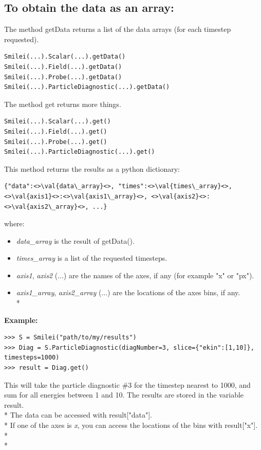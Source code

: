 \documentclass[11pt]{article}
\newcommand{\code}[1]{\colorbox{yellow!15}{\ttfamily #1}}
\newcommand{\val}[1]{{\ttfamily \textit{#1}}}
\begin{document}
\subsection{To obtain the data as an array:}
The method \code{getData} returns a list of the data arrays (for each timestep requested).
\begin{lstlisting}
Smilei(...).Scalar(...).getData()
Smilei(...).Field(...).getData()
Smilei(...).Probe(...).getData()
Smilei(...).ParticleDiagnostic(...).getData()
\end{lstlisting}

The method \code{get} returns more things.
\begin{lstlisting}
Smilei(...).Scalar(...).get()
Smilei(...).Field(...).get()
Smilei(...).Probe(...).get()
Smilei(...).ParticleDiagnostic(...).get()
\end{lstlisting}
This method returns the results as a python dictionary:
\begin{lstlisting}
{"data":<>\val{data\_array}<>, "times":<>\val{times\_array}<>, <>\val{axis1}<>:<>\val{axis1\_array}<>, <>\val{axis2}<>:<>\val{axis2\_array}<>, ...}
\end{lstlisting}
where:
\begin{itemize}
\item \val{data\_array} is the result of \code{getData()}.
\item \val{times\_array} is a list of the requested timesteps.
\item \val{axis1}, \val{axis2} (...) are the names of the axes, if any (for example \code{"x"} or \code{"px"}).
\item \val{axis1\_array}, \val{axis2\_array} (...) are the locations of the axes bins, if any.\\*
\end{itemize}

\textbf{Example:}
\begin{lstlisting}
>>> S = Smilei("path/to/my/results")
>>> Diag = S.ParticleDiagnostic(diagNumber=3, slice={"ekin":[1,10]}, timesteps=1000)
>>> result = Diag.get()
\end{lstlisting}
This will take the particle diagnostic \#3 for the timestep nearest to 1000, and sum for all energies between 1 and 10.
The results are stored in the variable \code{result}.\\*
The data can be accessed with \code{result["data"]}.\\*
If one of the axes is \val{x}, you can access the locations of the bins with \code{result["x"]}.\\* \\*
\end{document}
